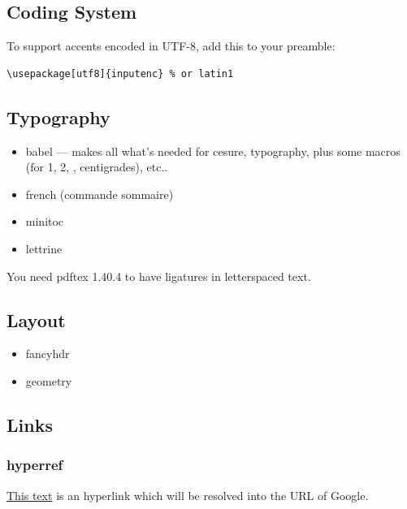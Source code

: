 \documentclass{boostreport}
\begin{document}
\subsection{Coding System}
\label{sec:coding-system}

To support accents encoded in UTF-8, add this to your preamble:

\begin{verbatim}
\usepackage[utf8]{inputenc} % or latin1
\end{verbatim}

\subsection{Typography}
\label{sec:typography}

\begin{itemize}
    \item babel --- makes all what's needed for cesure, typography, plus
    some macros (for 1\ier, 2\ieme, \no, \degres centigrades), etc..
    \item french (commande sommaire)
    \item minitoc
    \item lettrine
\end{itemize}

You need pdftex 1.40.4 to have ligatures in letterspaced text.


\subsection{Layout}
\label{sec:layout}

\begin{itemize}
    \item fancyhdr
    \item geometry
\end{itemize}

\subsection{Links}
\label{sec:links}

\subsubsection{hyperref}
\label{sec:hyperref}

\href{http://www.google.com}{This text} is an hyperlink which will be
resolved into the URL of Google.
\end{document}
